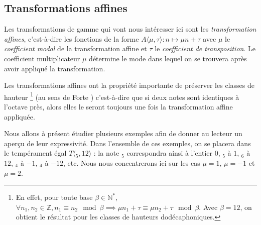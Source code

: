 \subsection{Transformations affines}

Les transformations de gamme qui vont nous intéresser ici sont les \emph{transformation affines}, c'est-à-dire les fonctions de la forme $A\langle\mu,\tau\rangle : n \mapsto \mu n + \tau$ avec $\mu$ le \emph{coefficient modal} de la transformation affine et $\tau$ le \emph{coefficient de transposition}. Le coefficient multiplicateur $\mu$ détermine le mode dans lequel on se trouvera après avoir appliqué la transformation. 

Les transformations affines ont la propriété importante de préserver les classes de hauteur \footnote{En effet, pour toute base $\beta\in \mathbb{N}^*$, $\forall n_1,n_2 \in \mathbb{Z}, n_1 \equiv n_2 \mod \beta \implies \mu n_1 + \tau \equiv \mu n_2 + \tau \mod \beta$. Avec $\beta=12$, on obtient le résultat pour les classes de hauteurs dodécaphoniques. }  (au sens de Forte \cite{forte1973structure}) c'est-à-dire que si deux notes sont identiques à l'octave près, alors elles le seront toujours une fois la transformation affine appliquée. 

Nous allons à présent étudier plusieurs exemples afin de donner au lecteur un aperçu de leur expressivité. Dans l'ensemble de ces exemples, on se placera dans le tempérament égal $T\langle $$_5,12\rangle$ : la note $_5$ correspondra ainsi à l'entier $0$, $_5$ à $1$, $_6$ à $12$, $_4$ à $-1$, $_4$ à $-12$, etc. Nous nous concentrerons ici sur les cas $\mu = 1$, $\mu = -1$ et $\mu = 2$.